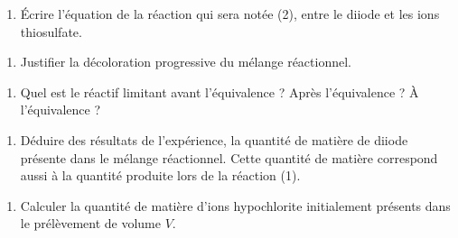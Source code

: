 \documentclass[a4paper,fontsize=10pt,fleqn]{scrartcl}%
\begin{document}
    
    \begin{enumerate}[resume]
        \item Écrire l'équation de la réaction qui sera notée (2), entre le diiode et les ions thiosulfate.
\end{enumerate}
\noindent \fbox{\begin{minipage}{\linewidth}
    \vspace{6em} \hspace{\linewidth}
\end{minipage}}

\begin{enumerate}[resume]
        \item Justifier la décoloration progressive du mélange réactionnel.
\end{enumerate}
\noindent \fbox{\begin{minipage}{\linewidth}
    \vspace{8em} \hspace{\linewidth}
\end{minipage}}

\begin{enumerate}[resume]
        \item Quel est le réactif limitant avant l'équivalence ? Après l'équivalence ? À l'équivalence ?
\end{enumerate}
\noindent \fbox{\begin{minipage}{\linewidth}
    \vspace{15em} \hspace{\linewidth}
\end{minipage}}

\begin{enumerate}[resume]
        \item Déduire des résultats de l'expérience, la quantité de matière de diiode présente dans le mélange réactionnel. Cette quantité de matière correspond aussi à la quantité produite lors de la réaction (1).
\end{enumerate}
\noindent \fbox{\begin{minipage}{\linewidth}
    \vspace{18em} \hspace{\linewidth}
\end{minipage}}

\begin{enumerate}[resume]
        \item Calculer la quantité de matière d'ions hypochlorite initialement présents dans le prélèvement de volume $V$.
\end{enumerate}
\noindent \fbox{\begin{minipage}{\linewidth}
    \vspace{18em} \hspace{\linewidth}
\end{minipage}}
\end{document}
